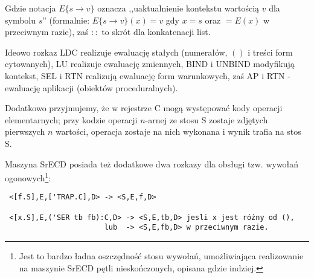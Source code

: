 \documentclass[a4paper]{article}
\begin{document}
Gdzie notacja $E\{s\rightarrow v\}$ oznacza ,,uaktualnienie kontekstu wartością $v$ dla symbolu $s$''
(formalnie: $E\{s \rightarrow v\}(x) = v$ gdy $x=s$ oraz $ = E(x)$ w przeciwnym razie), zaś $::$ to skrót
dla konkatenacji list.

Ideowo rozkaz LDC realizuje ewaluację stałych (numerałów, $()$ i treści form cytowanych),
LU realizuje ewaluację zmiennych, BIND i UNBIND modyfikują kontekst, SEL i RTN realizują
ewaluację form warunkowych, zaś AP i RTN - ewaluację aplikacji (obiektów proceduralnych).

Dodatkowo przyjmujemy, że w rejestrze C mogą występować kody operacji elementarnych; przy kodzie
operacji $n$-arnej ze stosu S zostaje zdjętych pierwszych $n$ wartości, operacja zostaje na nich
wykonana i wynik trafia na stos S.

Maszyna SrECD posiada też dodatkowe dwa rozkazy dla obsługi tzw. wywołań ogonowych\footnote{Jest
to bardzo ładna oszczędność stosu wywołań, umożliwiająca realizowanie na maszynie SrECD pętli
nieskończonych, opisana gdzie indziej.}:
\begin{verbatim}
 <[f.S],E,['TRAP.C],D> -> <S,E,f,D> 

 <[x.S],E,('SER tb fb):C,D> -> <S,E,tb,D> jesli x jest różny od (),
                       lub  -> <S,E,fb,D> w przeciwnym razie.
\end{verbatim}
\end{document}
